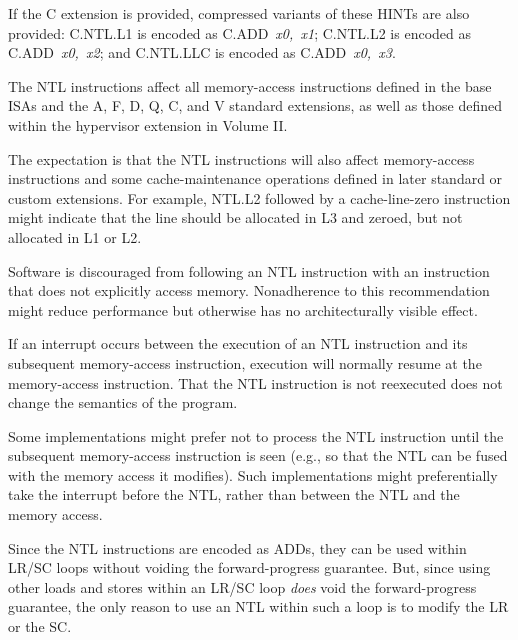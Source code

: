If the C extension is provided, compressed variants of these HINTs are also
provided:
C.NTL.L1 is encoded as \mbox{C.ADD {\em x0, x1}};
C.NTL.L2 is encoded as \mbox{C.ADD {\em x0, x2}};
and C.NTL.LLC is encoded as \mbox{C.ADD {\em x0, x3}}.

The NTL instructions affect all memory-access instructions defined in the
base ISAs and the A, F, D, Q, C, and V standard extensions,
as well as those defined within the hypervisor extension in Volume II.

\begin{commentary}
The expectation is that the NTL instructions will also affect memory-access
instructions and some cache-maintenance operations
defined in later standard or custom extensions.
For example, NTL.L2 followed by a cache-line-zero instruction might indicate
that the line should be allocated in L3 and zeroed, but not allocated in
L1 or L2.
\end{commentary}

Software is discouraged from following an NTL instruction with an
instruction that does not explicitly access memory.
Nonadherence to this recommendation might reduce performance but
otherwise has no architecturally visible effect.

\begin{commentary}
If an interrupt occurs between the execution of an NTL instruction and its
subsequent memory-access instruction, execution will normally resume at the
memory-access instruction.
That the NTL instruction is not reexecuted does not change the semantics of
the program.

Some implementations might prefer not to process the NTL instruction until the
subsequent memory-access instruction is seen (e.g., so that the NTL can be
fused with the memory access it modifies).
Such implementations might preferentially take the interrupt before the NTL,
rather than between the NTL and the memory access.
\end{commentary}

\begin{commentary}
Since the NTL instructions are encoded as ADDs, they can be used within LR/SC
loops without voiding the forward-progress guarantee.
But, since using other loads and stores within an LR/SC loop {\em does}
void the forward-progress guarantee, the only reason to use an NTL
within such a loop is to modify the LR or the SC.
\end{commentary}

